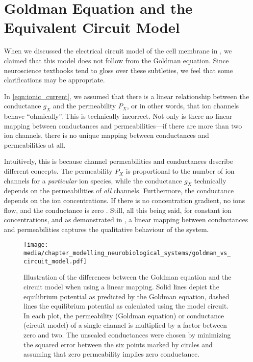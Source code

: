 \section{Goldman Equation and the Equivalent Circuit Model}
\label{app:goldman_equiv_circuit_diff}

When we discussed the electrical circuit model of the cell membrane in , we claimed that this model does not follow from the Goldman equation.
Since neuroscience textbooks tend to gloss over these subtleties, we feel that some clarifications may be appropriate.

In \cref{eqn:ionic_current}, we assumed that there is a linear relationship between the conductance $g_X$ and the permeability $P_X$, or in other words, that ion channels behave \enquote{ohmically}.
This is technically incorrect.
Not only is there no linear mapping between conductances and permeabilities---if there are more than two ion channels, there is no unique mapping between conductances and permeabilities at all.

Intuitively, this is because channel permeabilities and conductances describe different concepts.
The permeability $P_X$ is proportional to the number of ion channels for a \emph{particular} ion species, while the conductance $g_X$ technically depends on the permeabilities of \emph{all} channels.
Furthermore, the conductance depends on the ion concentrations.
If there is no concentration gradient, no ions flow, and the conductance is zero \citep{enderle2011bioelectric}.
Still, all this being said, for constant ion concentrations, and as demonstrated in , a linear mapping between conductances and permeabilities captures the qualitative behaviour of the system.

\begin{figure}
	\centering
	\texttt{[image: media/chapter\_modelling\_neurobiological\_systems/goldman\_vs\_circuit\_model.pdf]}
	\caption[Differences between the Goldman equation and the circuit model]{Illustration of the differences between the Goldman equation and the circuit model when using a linear mapping. Solid lines depict the equilibrium potential as predicted by the Goldman equation, dashed lines the equilibrium potential as calculated using the model circuit. In each plot, the permeability (Goldman equation) or conductance (circuit model) of a single channel is multiplied by a factor between zero and two. The unscaled conductances were chosen by minimizing the squared error between the six points marked by circles and assuming that zero permeability implies zero conductance.}
	\label{fig:goldman_vs_circuit_model}
\end{figure}

